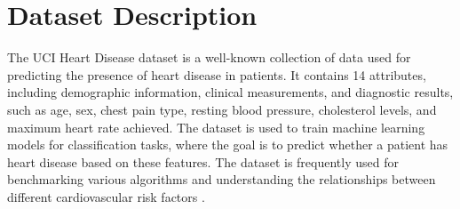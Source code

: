 \documentclass[pdflatex,sn-nature,Numbered]{sn-jnl}%
\theoremstyle{thmstyleone}%
\theoremstyle{thmstyletwo}%
\theoremstyle{thmstylethree}%
\begin{document}


\section{Dataset Description}
The UCI Heart Disease dataset \cite{dataset} is a well-known collection of data used for predicting the presence of heart disease in patients. It contains 14 attributes, including demographic information, clinical measurements, and diagnostic results, such as age, sex, chest pain type, resting blood pressure, cholesterol levels, and maximum heart rate achieved. The dataset is used to train machine learning models for classification tasks, where the goal is to predict whether a patient has heart disease based on these features. The dataset is frequently used for benchmarking various algorithms and understanding the relationships between different cardiovascular risk factors \cite{dataset}.
\end{document}
